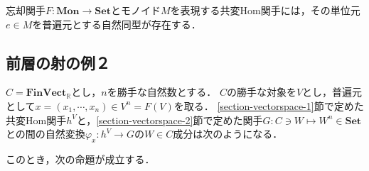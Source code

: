 \documentclass[uplatex, 12pt, dvipdfmx]{jsreport}
\begin{document}
\begin{screen}
    忘却関手$F:\mathbf{Mon}\to\mathbf{Set}$とモノイド$M$を表現する共変Hom関手には，その単位元$e\in M$を普遍元とする自然同型が存在する．
\end{screen}

\subsection{前層の射の例２}\label{section-vectorspace-base}

$C=\mathbf{FinVect}_\mathbb{R}$とし，$n$を勝手な自然数とする．
$C$の勝手な対象を$V$とし，普遍元として$x=(x_1,\cdots,x_n)\in V^n=F(V)$を取る．
\ref{section-vectorspace-1}節で定めた共変Hom関手$h^V$と，\ref{section-vectorspace-2}節で定めた関手$G:C\ni W\mapsto W^n\in\mathbf{Set}$との間の自然変換$\varphi_x:h^V\to G$の$W\in C$成分は次のようになる．
\begin{center}\end{center}
このとき，次の命題が成立する．
\end{document}
